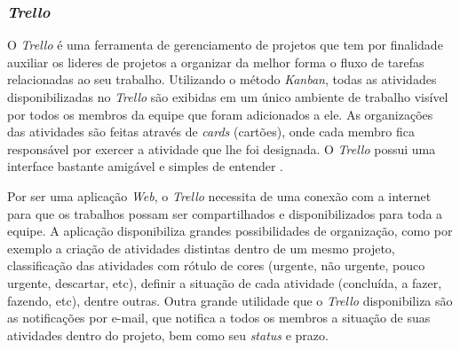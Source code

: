 \subsubsection{\textit{Trello}}

O \textit{Trello} é uma ferramenta de gerenciamento de projetos que tem por finalidade auxiliar os lideres de projetos a organizar da melhor forma o fluxo de tarefas relacionadas ao seu trabalho. Utilizando o método \textit{Kanban}, todas as atividades disponibilizadas no \textit{Trello} são exibidas em um único ambiente de trabalho visível por todos os membros da equipe que foram adicionados a ele. As organizações das atividades são feitas através de \textit{cards} (cartões), onde cada membro fica responsável por exercer a atividade que lhe foi designada. O \textit{Trello } possui uma interface bastante amigável e simples de entender \cite{TRELLO2017}. 

Por ser uma aplicação \textit{Web}, o \textit{Trello} necessita de uma conexão com a internet para que os trabalhos possam ser compartilhados e disponibilizados para toda a equipe. A aplicação disponibiliza grandes possibilidades de organização, como por exemplo a criação de atividades distintas dentro de um mesmo projeto, classificação das atividades com rótulo de cores (urgente, não urgente, pouco urgente, descartar, etc), definir a situação de cada atividade (concluída, a fazer, fazendo, etc), dentre outras. Outra grande utilidade que o \textit{Trello} disponibiliza são as notificações por e-mail, que notifica a todos os membros a situação de suas atividades dentro do projeto, bem como seu \textit{status} e prazo.